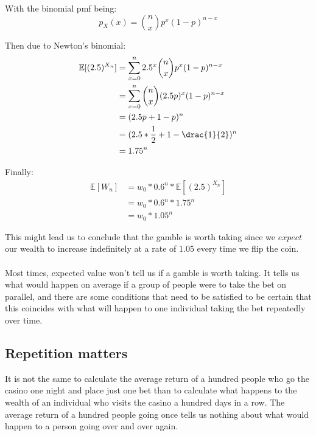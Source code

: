 \documentclass[12pt]{article}
\begin{document}
With the binomial pmf being:
\begin{equation}
    p_X(x) = {n \choose x} p^x (1-p)^{n-x}
\end{equation}

Then due to Newton's binomial:
\begin{equation*}
  \begin{split}
    \mathbb{E}[(2.5)^{X_n}] &= \sum\limits_{x=0}^{n} 2.5^x {n \choose x} p^x (1-p)^{n-x}\\
    &= \sum\limits_{x=0}^{n} {n \choose x} (2.5p)^x (1-p)^{n-x}\\
    &= (2.5p + 1 - p)^n \\ 
    &= (2.5 * \dfrac{1}{2} + 1 - \drac{1}{2})^n\\
    & = 1.75^n
  \end{split}
\end{equation*}

Finally:
\begin{equation*}
  \begin{split}
    \mathbb{E}[W_n] &= w_0 * 0.6^n * \mathbb{E}[(2.5)^{X_n}]\\
    &= w_0 * 0.6^n * 1.75^n\\
    &= w_0 * 1.05^n
  \end{split}
\end{equation*}

This might lead us to conclude that the gamble is worth taking since we $expect$ our wealth to increase indefinitely at a rate of $1.05$ every time we flip the coin.
\\\\
Most times, expected value won't tell us if a gamble is worth taking. It tells us what would happen on average if a group of people were to take the bet on parallel, and there are some conditions that need to be satisfied to be certain that this coincides with what will happen to one individual taking the bet repeatedly over time.

\subsection{Repetition matters}
It is not the same to calculate the average return of a hundred people who go the casino one night and place just one bet than to calculate what happens to the wealth of an individual who visits the casino a hundred days in a row. The average return of a hundred people going once tells us nothing about what would happen to a person going over and over again.
\end{document}
